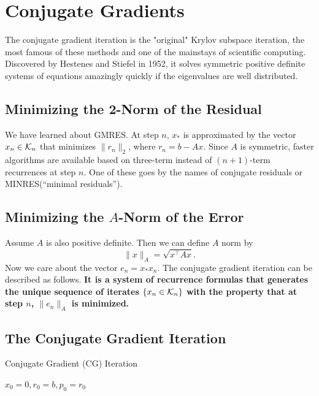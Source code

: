 \chapter{Conjugate Gradients}
The conjugate gradient iteration is the "original" Krylov subspace iteration, the most famous of these methods and one of the mainstays of scientific computing. Discovered by Hestenes and Stiefel in 1952, it solves symmetric positive definite systems of equations amazingly quickly if the eigenvalues are well distributed.

\section{Minimizing the 2-Norm of the Residual} 
 We have learned about GMRES. At step $ n $, $ x_* $ is approximated by the vector $ x_n \in \mathcal{K}_n $ that minimizes $ \|r_n\|_2 $, where $ r_n = b-Ax $. Since $ A $ is symmetric, faster algorithms are available based on three-term instead of $ (n+1) $-term recurrences at step $ n $. One of these goes by the names of conjugate residuals or MINRES(``minimal residuals'').  

 \section{Minimizing the $ A $-Norm of the Error} 
 Assume $ A $ is also positive definite. Then we can define $ A $ norm by 
 \[
    \|x\|_A = \sqrt{x^\top Ax} . 
 \]
Now we care about the vector $ e_n = x_* x_n $. The conjugate gradient iteration can be described as follows. \textbf{It is a system of recurrence formulas that generates the unique sequence of iterates $ \{x_n \in \mathcal{K}_n\}  $ with the property that at step $ n $, $ \|e_n\|_A $ is minimized.}


\section{The Conjugate Gradient Iteration} 
\begin{algorithm}[H]
    \caption{Conjugate Gradient (CG) Iteration}
    \label{Algo 38.1}
    $ x_0=0, r_0=b, p_0=r_0 $\;
\end{algorithm}

